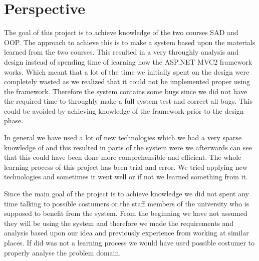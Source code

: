 \chapter{Perspective}
\label{chap:perspective}

The goal of this project is to achieve knowledge of the two courses SAD and OOP. The approach to achieve this is to make a system based upon the materials learned from the two courses. 
This resulted in a very throughly analysis and design instead of spending time of learning how the ASP.NET MVC2 framework works. Which meant that a lot of the time we initially spent on the design were completely wasted as we realized that it could not be implemented proper using the framework. 
Therefore the system contains some bugs since we did not have the required time to throughly make a full system test and correct all bugs. This could be avoided by achieving knowledge of the framework prior to the design phase. 




In general we have used a lot of new technologies which we had a very sparse knowledge of and this resulted in parts of the system were we afterwards can see that this could have been done more comprehensible and efficient. The whole learning process of this project has been trial and error. We tried applying new technologies and sometimes it went well or if not we learned something from it. 








Since the main goal of the project is to achieve knowledge we did not spent any time talking to possible costumers or the staff members of the university who is supposed to benefit from the system. From the beginning we have not assumed they will be using the system and therefore we made the requirements and analysis based upon our idea and previously experience from working at similar places. 
If did was not a learning process we would have used possible costumer to properly analyse the problem domain. 

